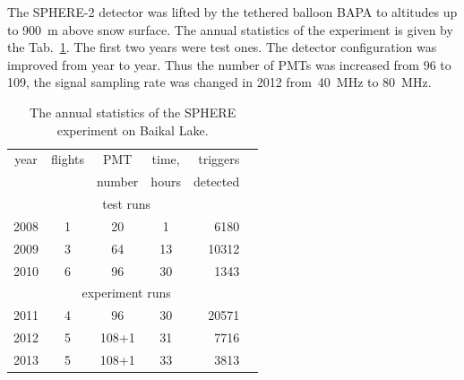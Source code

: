 \documentclass[final,5p,times,twocolumn]{elsarticle}
\begin{document}
The \mbox{SPHERE-2} detector was lifted by the tethered balloon BAPA to altitudes up to 900~m above snow surface. The annual statistics of the experiment is given by the Tab.~\ref{tab:statistics}. The first two years were test ones. The detector configuration was improved from year to year. Thus the number of PMTs was increased from 96 to 109, the signal sampling rate was changed in 2012 from~40~MHz to 80~MHz.

\begin{table}[tb]
\centering
\caption{The annual statistics of the SPHERE experiment on Baikal Lake.
}
\label{tab:statistics}
\vspace{1pc}
\begin{tabular}{|c||c|c|c|r|r|}
\hline
year  & flights & PMT    & time, & triggers \\ 
      &         & number & hours & detected \\ 
\hline \hline
\multicolumn{5}{|c|}{test runs} \\
\hline
2008 & 1 &  20 &  1 &  6180 \\ 
2009 & 3 &  64 & 13 & 10312 \\ 
2010 & 6 &  96 & 30 &  1343 \\
\hline
\multicolumn{5}{|c|}{experiment runs} \\
\hline
2011 & 4 &  96 & 30 & 20571 \\
2012 & 5 & 108+1 & 31 &  7716 \\
2013 & 5 & 108+1 & 33 &  3813 \\
\hline
\end{tabular}
\end{table}

\end{document}
